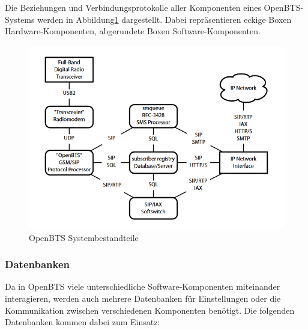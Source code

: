 Die Beziehungen und Verbindungsprotokolle aller Komponenten eines OpenBTS-Systems werden in Abbildung\ref{fig:openbts} dargestellt. Dabei repräsentieren eckige Boxen Hardware-Komponenten, abgerundete Boxen Software-Komponenten.
\begin{figure}[htbp]
	\centering
		\includegraphics[width=1.00\textwidth]{includes/openbts}
	\caption{OpenBTS Systembestandteile}
	\label{fig:openbts}
\end{figure}

\newpage

\subsubsection{Datenbanken}
Da in OpenBTS viele unterschiedliche Software-Komponenten miteinander interagieren, werden auch mehrere Datenbanken für Einstellungen oder die Kommunikation zwischen verschiedenen Komponenten benötigt. Die folgenden Datenbanken kommen dabei zum Einsatz:

